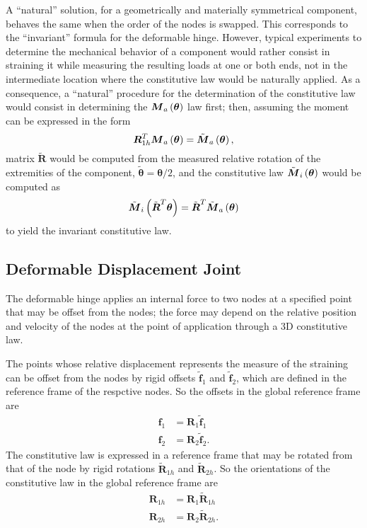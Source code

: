 \documentclass[10pt,dvips,fleqn,subeqn]{report}
\newcommand{\T}[1]{\boldsymbol{#1}}
\begin{document}
A ``natural'' solution, for a geometrically and materially symmetrical
component, behaves the same when the order of the nodes is swapped.
This corresponds to the ``invariant'' formula for the deformable hinge.
However, typical experiments to determine the mechanical behavior
of a component would rather consist in straining it while measuring
the resulting loads at one or both ends, not in the intermediate
location where the constitutive law would be naturally applied.
As a consequence, a ``natural'' procedure for the determination
of the constitutive law would consist in determining 
the $\T{M}_a\plbr{\T{\theta}}$ law first; 
then, assuming the moment can be expressed in the form
\begin{equation}
	\T{R}_{1h}^T \T{M}_a\plbr{\T{\theta}}
		= \tilde{\T{M}}_a\plbr{\T{\theta}} ,
\end{equation}
matrix $\tilde{\T{R}}$ would be computed
from the measured relative rotation of the extremities of the component,
$\tilde{\T{\theta}}=\T{\theta}/2$,
and the constitutive law $\tilde{\T{M}}_i\plbr{\T{\theta}}$ 
would be computed as
\begin{equation}
	\tilde{\T{M}}_i\plbr{\tilde{\T{R}}^T \T{\theta}}
		= \tilde{\T{R}}^T \tilde{\T{M}}_a\plbr{\T{\theta}}
\end{equation}
to yield the invariant constitutive law.




\subsection{Deformable Displacement Joint}
The deformable hinge applies an internal force to two nodes at a specified 
point that may be offset from the nodes; the force may depend on the relative
position and velocity of the nodes at the point of application
through a 3D constitutive law.

The points whose relative displacement represents the measure 
of the straining can be offset from the nodes by rigid offsets
$\tilde{\T{f}}_1$ and $\tilde{\T{f}}_2$, which are defined
in the reference frame of the respctive nodes.
So the offsets in the global reference frame are
\begin{align}
	\T{f}_1 &= \T{R}_1 \tilde{\T{f}}_1 \\
	\T{f}_2 &= \T{R}_2 \tilde{\T{f}}_2 .
\end{align}
The constitutive law is expressed in a reference frame that may be rotated
from that of the node by rigid rotations $\tilde{\T{R}}_{1h}$
and $\tilde{\T{R}}_{2h}$.
So the orientations of the constitutive law in the global reference frame are
\begin{align}
	\T{R}_{1h} &= \T{R}_1 \tilde{\T{R}}_{1h} \\
	\T{R}_{2h} &= \T{R}_2 \tilde{\T{R}}_{2h} .
\end{align}
\end{document}
